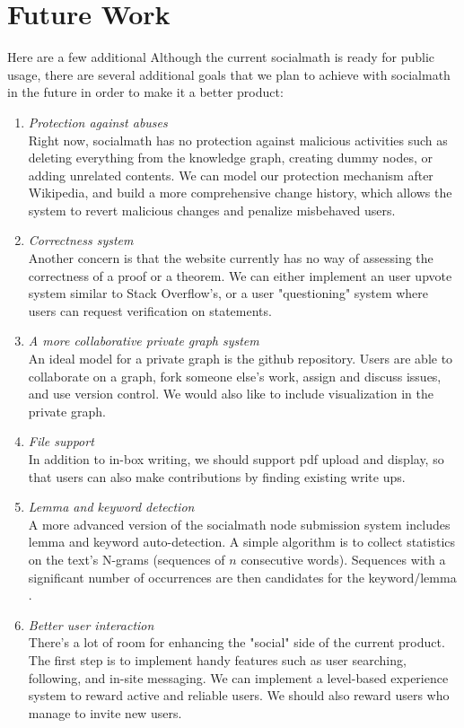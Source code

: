 \documentclass{acm_proc_article-sp}
\begin{document}
\section{Future Work} 
Here are a few additional 
Although the current socialmath is ready for public usage, there are several additional goals that we plan to achieve with socialmath in the future in order to make it a better product:
\begin{enumerate}
\item \emph{Protection against abuses} \\
Right now, socialmath has no protection against malicious activities such as deleting everything from the knowledge graph, creating dummy nodes, or adding unrelated contents. We can model our protection mechanism after Wikipedia, and build a more comprehensive change history, which allows the system to revert malicious changes and penalize misbehaved users. 
\item \emph{Correctness system} \\
Another concern is that the website currently has no way of assessing the correctness of a proof or a theorem. We can either implement an user upvote system similar to Stack Overflow's, or a user "questioning" system where users can request verification on statements. 
\item \emph{A more collaborative private graph system} \\
An ideal model for a private graph is the github repository. Users are able to collaborate on a graph, fork someone else's work, assign and discuss issues, and use version control. We would also like to include visualization in the private graph. 
\item \emph{File support} \\
In addition to in-box writing, we should support pdf upload and display, so that users can also make contributions by finding existing write ups. 
\item \emph{Lemma and keyword detection} \\
A more advanced version of the socialmath node submission system includes lemma and keyword auto-detection. A simple algorithm is to collect statistics on the text's N-grams (sequences of $n$ consecutive words).  Sequences with a significant number of occurrences are then candidates for the keyword/lemma \cite{Kumar:2008:AKE:1410140.1410180}.
\item \emph{Better user interaction} \\
There's a lot of room for enhancing the "social" side of the current product. The first step is to implement handy features such as user searching, following, and in-site messaging. We can implement a level-based experience system to reward active and reliable users. We should also reward users who manage to invite new users.
\end{enumerate}
\end{document}

